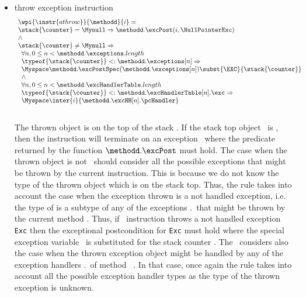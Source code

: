 \begin{itemize}
						
						
						
						
					
\item throw exception instruction \\
				
							$$ \begin{array}{l}
							          \wpi{\instr{athrow }} {\methodd}{i}  = \\
								    \stack{\counter} = \Mynull \Rightarrow  \methodd.\excPost( i, \NullPointerExc) \\  
								     \wedge \\
							          \stack{\counter} \neq \Mynull \Rightarrow \\
								    \begin{array}{l}  
								      \forall n, 0 \le n < \methodd. \exceptions.length \\  
								      \typeof{\stack{\counter}} <:  \methodd.\exceptions[n] \Rightarrow \\
								      \Myspace \methodd.\excPostSpec( \methodd.\exceptions[n]  )\subst{ \EXC }{\stack{\counter}  } \\
								      \wedge \\
								      \forall n, 0 \le n < \methodd.\excHandlerTable.length \\  
								      \typeof{\stack{\counter}} <: \methodd. \excHandlerTable[n].\exc \Rightarrow \\
								      \Myspace  \inter{i}{\methodd. \excHH[n].\pcHandler}
								                     
								    \end{array} 
							   \end{array}
							$$ \\
						The thrown object is on the top of the stack \stack{\counter}.
						If the stack top object \stack{\counter} \ is \Mynull, then the instruction \athrow will terminate on an exception
						\NullPointerExc \ where the predicate returned by the function $ \methodd.\excPost$ must hold.
						The case when  the thrown object is not \Mynull \  should consider all the possible exceptions that
						might be thrown by the current instruction. This is because we do not know the type of the thrown object which is
						on the stack top. Thus, the rule takes into account the case when the exception thrown is a not handled exception,
						i.e. the type    of \stack{\counter} is a subtype of any  of the exceptions \methodd.\exceptions \ that might be thrown
						by the current method \methodd. Thus, if  \athrow \ instruction throws a not handled exception \texttt{Exc} 
						then  the exceptional postcondition for  \texttt{Exc} must hold where the special exception variable \EXC \ 
						is substituted for the stack counter \stack{\counter}. 
 						The \fwpi \ considers also the case when the thrown exception object  might be handled by any of the
						exception handlers \methodd.\excHandlerTable \ of method \ \methodd. 
						In that case, once again the rule takes into account all the possible exception handler types as the type of the
						thrown exception is unknown.
						
	 		\end{itemize}
